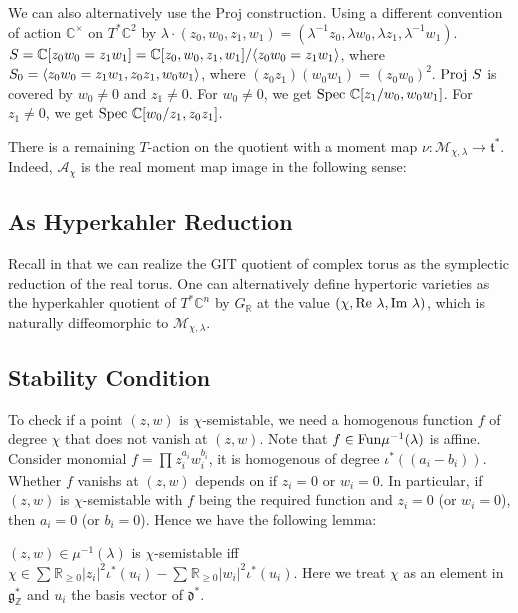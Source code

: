 \documentclass[b5paper]{article}
\newcommand{\MM}{\mathcal{M}}
\newcommand{\Proj}{\textnormal{Proj }}
\newcommand{\Spec}{\textnormal{Spec }}
\begin{document}
\begin{example}[exp:]{}
  We can also alternatively use the Proj construction. Using a different convention of action $\mathbb{C}^\times $ on $T^*\mathbb{C}^2$ by $\lambda\cdot (z_0,w_0,z_1,w_1)=(\lambda^{-1}z_0,\lambda w_0,\lambda z_1,\lambda^{-1}w_1)$. $S=\mathbb{C}[z_0w_0=z_1w_1]=\mathbb{C}[z_0,w_0,z_1,w_1]/\langle z_0w_0=z_1w_1\rangle$, where $S_0=\langle z_0w_0=z_1w_1, z_0z_1,w_0w_1\rangle$, where $(z_0z_1)(w_0w_1)=(z_0w_0)^2$. $\Proj S$ is covered by $w_0\neq 0$ and $z_1\neq 0$. For $w_0\neq 0$, we get $\Spec \mathbb{C}[z_1/w_0,w_0w_1]$. For $z_1\neq 0$, we get $\Spec\mathbb{C}[w_0/z_1,z_0z_1]$.
\end{example}

There is a remaining $T$-action on the quotient with a moment map $ \nu : \mathcal{M}_{\chi, \lambda} \to \mathfrak{t}^* $.
Indeed, $\mathcal{A}_\chi$ is the real moment map image in the following sense:
\missing{}


\subsection{As Hyperkahler Reduction}

Recall in  that we can realize the GIT quotient of complex torus as the symplectic reduction of the real torus. One can alternatively define hypertoric varieties as the hyperkahler quotient of $T^*\mathbb{C}^n$ by $G_\mathbb{R}$ at the value $(\chi,\textnormal{Re }\lambda,\textnormal{Im }\lambda)$, which is naturally diffeomorphic to $\MM_{\chi,\lambda}$.

\subsection{Stability Condition}

To check if a point $(z,w)$ is $\chi$-semistable, we need a homogenous function $f$ of degree $\chi$ that does not vanish at $(z,w)$. Note that $f\in \textnormal{Fun}\mu^{-1}(\lambda)$ is affine. Consider monomial $f=\prod_{}^{}z_i^{a_i}w_i^{b_i}$, it is homogenous of degree $\iota^*((a_i-b_i))$. Whether $f$ vanishs at $(z,w)$ depends on if $z_i=0$ or $w_i=0$. In particular, if $(z,w)$ is $\chi$-semistable with $f$ being the required function and $z_i=0$ (or $w_i=0$), then $a_i=0$ (or $b_i=0$). Hence we have the following lemma:

\begin{lemma}{}
  $(z,w)\in \mu^{-1}(\lambda)$ is $\chi$-semistable iff $\chi\in \sum_{}^{}\mathbb{R}_{\geq 0}|z_i|^2\iota^{*}(u_i)-\sum_{}^{}\mathbb{R}_{\geq 0}|w_i|^2\iota^{*}(u_i)$. Here we treat $\chi$ as an element in $\mathfrak{g}^*_{\mathbb{Z}}$ and $u_i$ the basis vector of $\mathfrak{d}^*$.
\end{lemma}
\end{document}
